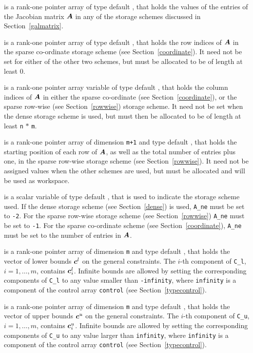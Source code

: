 \documentclass{galahad}
\begin{document}
\begin{description}
 is a rank-one pointer array of type default \realdp, that holds
the values of the entries of the Jacobian matrix ${\bm{A}}$ in any of the 
storage schemes discussed in Section~\ref{galmatrix}.

 is a rank-one pointer array of type default \integer,
that holds the row indices  of ${\bm{A}}$ in the sparse co-ordinate storage
scheme (see Section~\ref{coordinate}). 
It need not be set for either of the other
two schemes, but must be allocated to be of length at least 0.

 is a rank-one pointer array variable of type default \integer,
that holds the column indices  of ${\bm{A}}$ in either the sparse co-ordinate 
(see Section~\ref{coordinate}), or the sparse row-wise 
(see Section~\ref{rowwise}) storage scheme.
It need not be set when the dense storage scheme is used,
but must then be allocated to be of length at least {\tt n} $\ast$ {\tt m}.

 is a rank-one pointer array of dimension {\tt m+1} and type 
default \integer, that holds the 
starting position of each row of ${\bm{A}}$, as well
as the total number of entries plus one, in the sparse row-wise storage
scheme (see Section~\ref{rowwise}). It need not be assigned values when the
other schemes are used, but must be allocated and will be used as
workspace.

 is a scalar variable of type default \integer, that is used to
indicate the storage scheme used. If the dense storage scheme 
(see Section~\ref{dense}) is used, {\tt A\_ne} must be set to {\tt -2}. 
For the sparse row-wise storage scheme (see Section~\ref{rowwise}) 
{\tt A\_ne} must be set to {\tt -1}.
For the sparse co-ordinate scheme (see Section~\ref{coordinate}), 
{\tt A\_ne} must be set to the number of entries in ${\bm{A}}$.

 is a rank-one pointer array of dimension {\tt m} and type 
default \realdp, that holds the vector of lower bounds ${\bm{c}}^{l}$ 
on the general constraints. The $i$-th component of 
{\tt C\_l}, $i = 1, \ldots , m$, contains ${\bm{c}}_{i}^{l}$.
Infinite bounds are allowed by setting the corresponding 
components of {\tt C\_l} to any value smaller than {\tt -infinity}, 
where {\tt infinity} is a component of the control array {\tt control} 
(see Section~\ref{typecontrol}).

 is a rank-one pointer array of dimension {\tt m} and type 
default \realdp, that holds the vector of upper bounds ${\bm{c}}^{u}$ 
on the general constraints. The $i$-th component of 
{\tt C\_u}, $i = 1,  \ldots ,  m$, contains ${\bm{c}}_{i}^{u}$.
Infinite bounds are allowed by setting the corresponding 
components of {\tt C\_u} to any value larger than {\tt infinity}, 
where {\tt infinity} is a component of the control array {\tt control} 
(see Section~\ref{typecontrol}).


\end{description}
\end{document}
